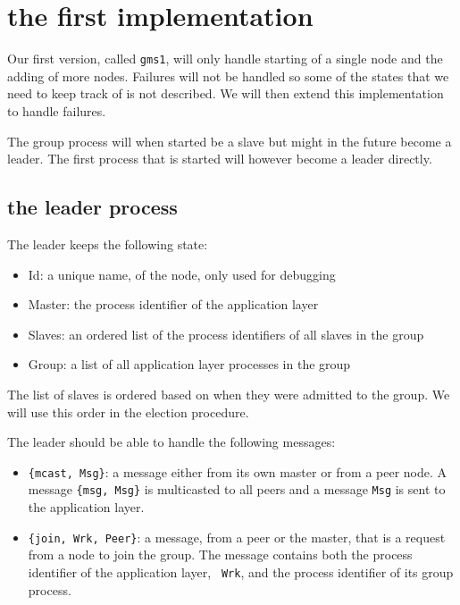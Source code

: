 \documentclass[a4paper,11pt]{article}
\begin{document}
\section{the first implementation}

Our first version, called {\tt gms1}, will only handle starting of a
single node and the adding of more nodes. Failures will not be handled so
some of the states that we need to keep track of is not described. We
will then extend this implementation to handle failures.

The group process will when started be a slave but might in the future
become a leader. The first process that is started will however become a
leader directly.

\subsection{the leader process}

The leader keeps the following state:

\begin{itemize}
\item Id: a unique name, of the node, only used for debugging
\item Master: the process identifier of the application layer
\item Slaves: an ordered list of the process identifiers of all slaves in the group
\item Group: a list of all application layer processes in the group
\end{itemize}

The list of slaves is ordered based on when they were admitted to the
group. We will use this order in the election procedure.

The leader should be able to handle the following messages:

\begin{itemize}
\item {\tt\{mcast, Msg\}}: a message either from its own master or
  from a peer node. A message {\tt\{msg, Msg\}} is multicasted to all
  peers and a message {\tt Msg} is sent to the application
  layer.
\item {\tt \{join, Wrk, Peer\}}: a message, from a peer or the master,
  that is a request from a node to join the group. The message
  contains both the process identifier of the application layer, {\tt
    Wrk}, and the process identifier of its group process.
\end{itemize}
\end{document}
